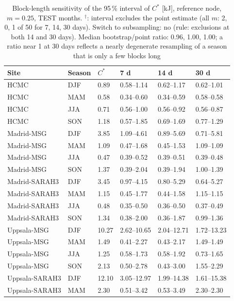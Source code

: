 \begin{table}[H]\centering\footnotesize\caption{Block-length sensitivity of the 95\,\% interval of $C^*$ [kJ], reference node, $m=0.25$, TEST months. $^\dagger$: interval excludes the point estimate (all $m$: 2, 0, 1 of 50 for 7, 14, 30 days). Switch to subsampling: no (rule: exclusions at both 14 and 30 days). Median bootstrap/point ratio: 0.96, 1.00, 1.00; a ratio near 1 at 30 days reflects a nearly degenerate resampling of a season that is only a few blocks long}\label{tab:s_block_test}
\begin{tabular}{@{}llllll@{}}\toprule
Site & Season & $C^*$ & 7 d & 14 d & 30 d\\\midrule
HCMC & DJF & 0.89 & 0.58--1.14 & 0.62--1.17 & 0.62--1.01\\
HCMC & MAM & 0.58 & 0.34--0.60 & 0.34--0.59 & 0.58--0.58\\
HCMC & JJA & 0.71 & 0.56--1.00 & 0.56--0.92 & 0.56--0.87\\
HCMC & SON & 1.18 & 0.57--1.85 & 0.69--1.69 & 0.77--1.29\\
Madrid-MSG & DJF & 3.85 & 1.09--4.61 & 0.89--5.69 & 0.71--5.81\\
Madrid-MSG & MAM & 1.09 & 0.47--1.68 & 0.45--1.53 & 1.09--1.09\\
Madrid-MSG & JJA & 0.47 & 0.39--0.52 & 0.39--0.51 & 0.39--0.48\\
Madrid-MSG & SON & 1.37 & 0.39--2.04 & 0.39--1.94 & 1.00--1.39\\
Madrid-SARAH3 & DJF & 3.45 & 0.97--4.15 & 0.80--5.29 & 0.64--5.27\\
Madrid-SARAH3 & MAM & 1.15 & 0.45--1.77 & 0.44--1.58 & 1.15--1.15\\
Madrid-SARAH3 & JJA & 0.48 & 0.35--0.50 & 0.36--0.50 & 0.37--0.49\\
Madrid-SARAH3 & SON & 1.34 & 0.38--2.00 & 0.36--1.87 & 0.99--1.36\\
Uppsala-MSG & DJF & 10.27 & 2.62--10.65 & 2.04--12.71 & 1.72--13.23\\
Uppsala-MSG & MAM & 1.49 & 0.41--2.27 & 0.43--2.17 & 1.49--1.49\\
Uppsala-MSG & JJA & 1.25 & 0.58--1.73 & 0.58--1.92 & 0.73--1.65\\
Uppsala-MSG & SON & 2.13 & 0.50--2.78 & 0.43--3.00 & 1.55--2.29\\
Uppsala-SARAH3 & DJF & 12.10 & 3.05--12.97 & 1.99--14.38 & 1.61--15.38\\
Uppsala-SARAH3 & MAM & 2.30 & 0.51--3.42 & 0.53--3.49 & 2.30--2.30\\

\end{tabular}
\end{table}
